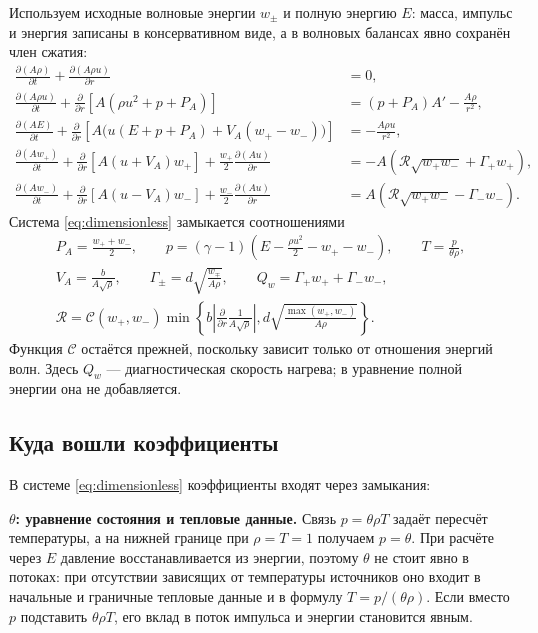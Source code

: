 \documentclass[11pt,a4paper]{article}
\newcommand{\PA}{P_A}
\newcommand{\VA}{V_A}
\newcommand{\Rref}{\mathcal R}
\begin{document}
Используем исходные волновые энергии $w_\pm$ и полную энергию $E$:
масса, импульс и энергия записаны в консервативном виде,
а в волновых балансах явно сохранён член сжатия:
\begin{equation}
\begin{aligned}
 \frac{\partial(A\rho)}{\partial t}+\frac{\partial(A\rho u)}{\partial r}&=0,\\[4pt]
 \frac{\partial(A\rho u)}{\partial t}+\frac{\partial}{\partial r}\!\left[A(\rho u^2+p+\PA)\right]
 &=(p+\PA)A'-\frac{A\rho}{r^2},\\[4pt]
 \frac{\partial(AE)}{\partial t}+\frac{\partial}{\partial r}
 \!\left[A\bigl(u(E+p+\PA)+\VA(w_+-w_-)\bigr)\right]
 &=-\frac{A\rho u}{r^2},\\[4pt]
 \frac{\partial(Aw_+)}{\partial t}
 +\frac{\partial}{\partial r}\!\left[A(u+\VA)w_+\right]
 +\frac{w_+}{2}\frac{\partial(Au)}{\partial r}
 &=-A\left(\Rref\sqrt{w_+w_-}+\Gamma_+w_+\right),\\[4pt]
 \frac{\partial(Aw_-)}{\partial t}
 +\frac{\partial}{\partial r}\!\left[A(u-\VA)w_-\right]
 +\frac{w_-}{2}\frac{\partial(Au)}{\partial r}
 &=A\left(\Rref\sqrt{w_+w_-}-\Gamma_-w_-\right).
\end{aligned}
\label{eq:dimensionless}
\end{equation}
Система \eqref{eq:dimensionless} замыкается соотношениями
\[
\begin{gathered}
 \PA=\frac{w_++w_-}{2},\qquad
 p=(\gamma-1)\left(E-\frac{\rho u^2}{2}-w_+-w_-\right),
 \qquad T=\frac{p}{\theta\rho},\\[4pt]
 \VA=\frac{b}{A\sqrt\rho},\qquad
 \Gamma_\pm=d\sqrt{\frac{w_\mp}{A\rho}},\qquad
 Q_w=\Gamma_+w_++\Gamma_-w_-,\\[4pt]
 \Rref=\mathcal C(w_+,w_-)
 \min\!\left\{
 b\left|\frac{\partial}{\partial r}\frac1{A\sqrt\rho}\right|,
 d\sqrt{\frac{\max(w_+,w_-)}{A\rho}}
 \right\}.
\end{gathered}
\]
Функция $\mathcal C$ остаётся прежней, поскольку зависит
только от отношения энергий волн. Здесь $Q_w$ --- диагностическая
скорость нагрева; в уравнение полной энергии она не добавляется.

\subsection*{Куда вошли коэффициенты}

В системе \eqref{eq:dimensionless} коэффициенты входят через замыкания:

\textbf{$\theta$: уравнение состояния и тепловые данные.}
Связь $p=\theta\rho T$ задаёт пересчёт температуры, а на нижней
границе при $\rho=T=1$ получаем $p=\theta$.
При расчёте через $E$ давление восстанавливается из энергии,
поэтому $\theta$ не стоит явно в потоках: при отсутствии зависящих
от температуры источников оно входит в начальные и граничные
тепловые данные и в формулу $T=p/(\theta\rho)$.
Если вместо $p$ подставить $\theta\rho T$, его вклад в поток
импульса и энергии становится явным.
\end{document}
